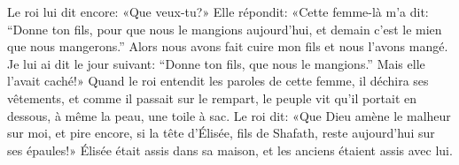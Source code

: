 Le roi lui dit encore:
		«Que veux-tu?»
	Elle répondit: «Cette femme-là m’a dit:
	“Donne ton fils, pour que nous le mangions aujourd’hui,
	et demain c’est le mien que nous mangerons.”
Alors nous avons fait cuire mon fils et nous l’avons mangé.
Je lui ai dit le jour suivant: “Donne ton fils, que nous le mangions.”
	Mais elle l’avait caché!»
Quand le roi entendit les paroles de cette femme, il déchira ses vêtements,
	et comme il passait sur le rempart,
	le peuple vit qu’il portait en dessous, à même la peau, une toile à sac.
Le roi dit: «Que Dieu amène le malheur sur moi, et pire encore,
	si la tête d’Élisée, fils de Shafath, reste aujourd’hui sur ses épaules!»
Élisée était assis dans sa maison, et les anciens étaient assis avec lui.
